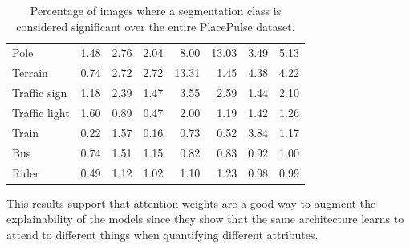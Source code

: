 \begin{table}[H]
\begin{tabular}{|l|rrrrrrr|}
		Pole          & 1.48           & 2.76           & 2.04           & 8.00           & 13.03          & 3.49           & 5.13           \\
		Terrain       & 0.74           & 2.72           & 2.72           & 13.31          & 1.45           & 4.38           & 4.22           \\
		Traffic sign  & 1.18           & 2.39           & 1.47           & 3.55           & 2.59           & 1.44           & 2.10           \\
		Traffic light & 1.60           & 0.89           & 0.47           & 2.00           & 1.19           & 1.42           & 1.26           \\
		Train         & 0.22           & 1.57           & 0.16           & 0.73           & 0.52           & 3.84           & 1.17           \\
		Bus           & 0.74           & 1.51           & 1.15           & 0.82           & 0.83           & 0.92           & 1.00           \\
		Rider         & 0.49           & 1.12           & 1.02           & 1.10           & 1.23           & 0.98           & 0.99 \\
		\hline
	\end{tabular}
	\caption[Percentage of class significance]{
		Percentage of images where a segmentation class is considered significant over the entire PlacePulse dataset.
	}
	\label{tab:total_sig}
\end{table}

This results support that attention weights are a good way to augment the explainability of
the models since they show that the same architecture learns to attend to different things
when quantifying different attributes.

